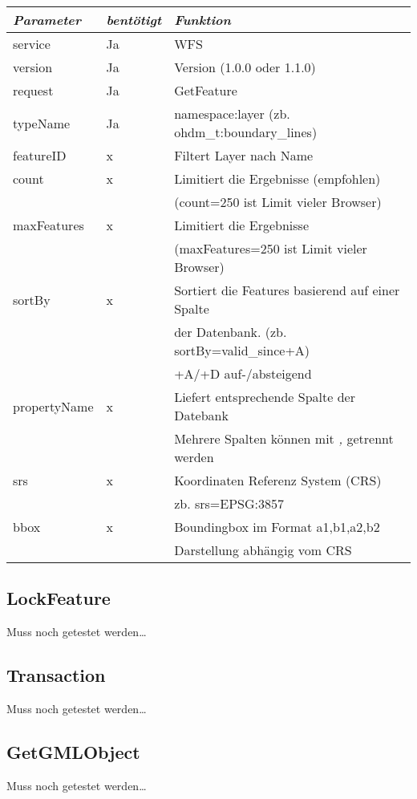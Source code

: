 \begin{tabular}{lll}
\emph{Parameter} & \emph{bentötigt} & \emph{Funktion} \\
\hline
service	& Ja & 	 WFS\\
\hline
version	& Ja &	 Version (1.0.0 oder 1.1.0)\\
\hline
request	& Ja &	GetFeature\\
\hline
typeName	& Ja &	namespace:layer (zb. ohdm\_t:boundary\_lines)\\
\hline
featureID & x & Filtert Layer nach Name\\
\hline
count & x & Limitiert die Ergebnisse (empfohlen)\\&& (count=250 ist Limit vieler Browser)\\
\hline
maxFeatures & x & Limitiert die Ergebnisse \\&&(maxFeatures=250 ist Limit vieler Browser)\\
\hline
sortBy & x & Sortiert die Features basierend auf einer Spalte \\&&der Datenbank. (zb. sortBy=valid\_since+A)\\&& +A/+D auf-/absteigend\\
\hline
propertyName & x & Liefert entsprechende Spalte der Datebank\\&&Mehrere Spalten können mit \emph{,} getrennt werden\\
\hline
srs & x & Koordinaten Referenz System (CRS)\\&& zb. srs=EPSG:3857\\
\hline
bbox & x& Boundingbox im Format a1,b1,a2,b2\\&& Darstellung abhängig vom CRS\\
\end{tabular}
\subsection*{LockFeature}
Muss noch getestet werden\ldots
\subsection*{Transaction}
Muss noch getestet werden\ldots
\subsection*{GetGMLObject}
Muss noch getestet werden\ldots
